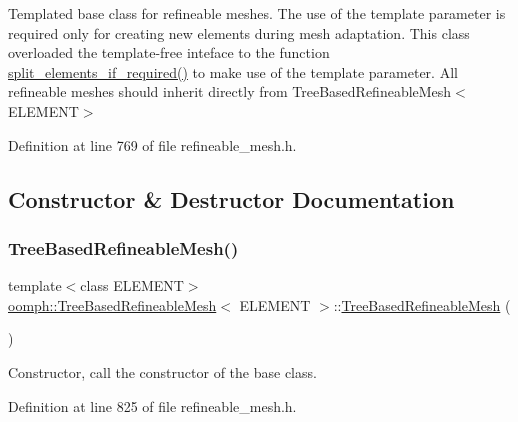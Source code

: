 Templated base class for refineable meshes. The use of the template parameter is required only for creating new elements during mesh adaptation. This class overloaded the template-\/free inteface to the function \hyperlink{classoomph_1_1TreeBasedRefineableMesh_a43f134cb974f25f25d5ddfa88d56ef95}{split\+\_\+elements\+\_\+if\+\_\+required()} to make use of the template parameter. All refineable meshes should inherit directly from Tree\+Based\+Refineable\+Mesh$<$\+E\+L\+E\+M\+E\+N\+T$>$ 

Definition at line 769 of file refineable\+\_\+mesh.\+h.



\subsection{Constructor \& Destructor Documentation}
\mbox{\label{classoomph_1_1TreeBasedRefineableMesh_a6ac1734d39cf26e7f855b55ac8a3a760}} 
\subsubsection{\texorpdfstring{Tree\+Based\+Refineable\+Mesh()}{TreeBasedRefineableMesh()}\hspace{0.1cm}{\footnotesize\ttfamily [1/2]}}
{\footnotesize\ttfamily template$<$class E\+L\+E\+M\+E\+NT$>$ \\
\hyperlink{classoomph_1_1TreeBasedRefineableMesh}{oomph\+::\+Tree\+Based\+Refineable\+Mesh}$<$ E\+L\+E\+M\+E\+NT $>$\+::\hyperlink{classoomph_1_1TreeBasedRefineableMesh}{Tree\+Based\+Refineable\+Mesh} (\begin{DoxyParamCaption}{ }\end{DoxyParamCaption})\hspace{0.3cm}{\ttfamily [inline]}}



Constructor, call the constructor of the base class. 



Definition at line 825 of file refineable\+\_\+mesh.\+h.

\mbox{\label{classoomph_1_1TreeBasedRefineableMesh_ac6057aeeec66fb9d0b5bbe0562a6e727}} 
